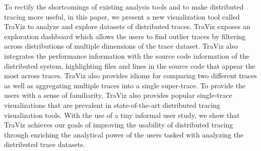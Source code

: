 To rectify the shortcomings of existing analysis tools and to make distributed tracing more useful,
in this paper, we present a new visualization tool called TraViz to analyze
and explore datasets of distributed traces. TraViz exposes an exploration dashboard which
allows the users to find outlier traces by filtering across distributions of multiple
dimensions of the trace dataset. TraViz also integrates the performance information with
the source code information of the distributed system, highlighting files and lines in the
source code that appear the most across traces. TraViz also provides idioms for comparing
two different traces as well as aggregating multiple traces into a single super-trace.
To provide the users with a sense of familiarity, TraViz also provides popular single-trace visualizations
that are prevalent in state-of-the-art distributed tracing visualization tools.
With the use of a tiny informal user study, we show that TraViz achieves our goals of improving
the usability of distributed tracing through enriching the analytical power of the users tasked
with analyzing the distributed trace datasets.